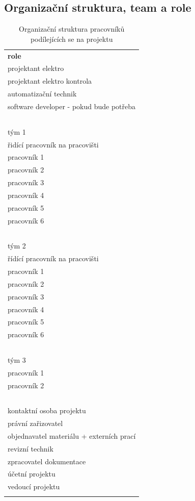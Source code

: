\documentclass[a4paper, twoside, 11pt]{article}
\begin{document}
	\subsection{Organizační struktura, team a role}
		\begin{table}[H]
		
			\begin{tabular}{ !{\vrule width 2pt} l !{\vrule width 2pt} }
				\textbf{role} \\ 
				projektant elektro \\ \hline
				projektant elektro kontrola \\ \hline
				automatizační technik \\ \hline
				software developer - pokud bude potřeba \\ \hline
				\  \\ \hline
				tým 1 \\ \hline
				řidící pracovník na pracovišti \\ \hline
				pracovník 1 \\ \hline
				pracovník 2 \\ \hline
				pracovník 3 \\ \hline
				pracovník 4 \\ \hline
				pracovník 5 \\ \hline
				pracovník 6 \\ \hline
				\  \\ \hline
				tým 2 \\ \hline
				řídící pracovník na pracovišti \\ \hline
				pracovník 1 \\ \hline
				pracovník 2 \\ \hline
				pracovník 3 \\ \hline
				pracovník 4 \\ \hline
				pracovník 5 \\ \hline
				pracovník 6 \\ \hline
				\  \\ \hline
				tým 3 \\ \hline
				pracovník 1 \\ \hline
				pracovník 2 \\ \hline
				\  \\ \hline
				kontaktní osoba projektu \\ \hline
				právní zařizovatel \\ \hline
				objednavatel materiálu + externích prací \\ \hline
				revizní technik \\ \hline
				zpracovatel dokumentace \\ \hline
				účetní projektu \\ \hline
				vedoucí projektu\\ 
		
			\end{tabular}
		\caption{Organizační struktura pracovníků podílejících se na projektu}
		\end{table}
		
\end{document}

